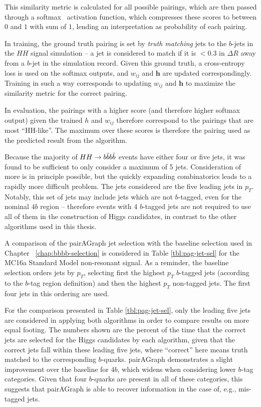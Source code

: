 This similarity metric is calculated for all possible pairings, which are then passed through a 
softmax~\cite{Softmax} activation function, which compresses these scores to between $0$ and $1$ 
with sum of $1$, lending an interpretation as probability of each pairing.

In training, the ground truth pairing is set by \emph{truth matching} jets to the $b$-jets 
in the $HH$ signal simulation -- a jet is considered to match if it is $< 0.3$ in $\Delta R$
away from a $b$-jet in the simulation record. Given this ground truth, a cross-entropy loss 
is used on the softmax outputs, and $w_{ij}$ and $\mathbf{h}$ are updated correspondingly.
Training in such a way corresponds to updating $w_{ij}$ and $\mathbf{h}$ to maximize the similarity 
metric for the correct pairing.

In evaluation, the pairings with a higher score (and therefore higher softmax output) given 
the trained $h$ and $w_{ij}$ therefore correspond to the pairings that are most ``HH-like''. 
The maximum over these scores is therefore the pairing used as the predicted result from 
the algorithm.

Because the majority of $HH\rightarrow b\bar{b}b\bar{b}$ events have either four or five jets, it was 
found to be sufficient to only consider a maximum of 5 jets. Consideration of more is in 
principle possible, but the quickly expanding combinatorics leads to a rapidly more 
difficult problem. The jets considered are the five leading jets in $p_{T}$. Notably, 
this set of jets may include jets which are not $b$-tagged, even for the nominal $4b$ 
region -- therefore events with $4$ $b$-tagged jets are not required to use all of them 
in the construction of Higgs candidates, in contrast to the other algorithms used in this 
thesis.

A comparison of the pairAGraph jet selection with the baseline selection used in Chapter ~\ref{chap:bbbb-selection} 
is considered in Table \ref{tbl:pag-jet-sel} for the MC16a Standard Model non-resonant signal. As a reminder, 
the baseline selection orders jets by $p_{T}$, selecting first the highest $p_{T}$ $b$-tagged jets (according 
to the $b$-tag region definition) and then the highest $p_{T}$ non-tagged jets. The first four jets 
in this ordering are used. 

For the comparison presented in Table \ref{tbl:pag-jet-sel}, only the leading five jets are considered in 
applying both algorithms in order to compare results on more equal footing. The numbers shown are the percent 
of the time that the correct jets are selected for the Higgs candidates by each algorithm, given that the 
correct jets fall within these leading five jets, where ``correct'' here means truth matched to the 
corresponding $b$-quarks. pairAGraph demonstrates a slight improvement over the baseline for $4b$, which widens when 
considering lower $b$-tag categories. Given that four $b$-quarks are present in all of these 
categories, this suggests that pairAGraph is able to recover information in the case of, e.g., mis-tagged 
jets.

